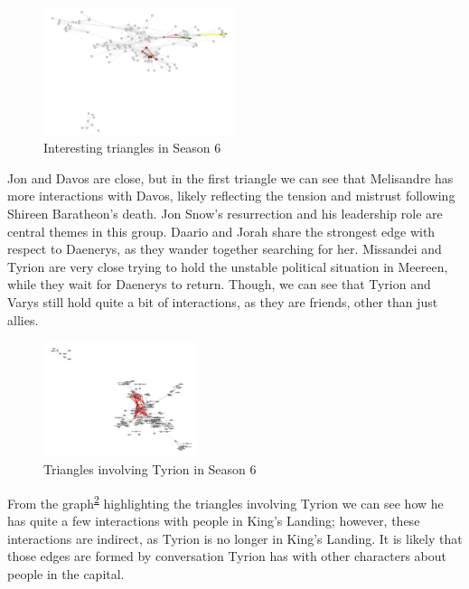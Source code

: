 \documentclass[10pt,twocolumn,letterpaper]{article}
\begin{document}
\begin{figure}[!h]
    \centering
    \includegraphics[width=0.5\textwidth]{img/s6/s6_triangles.jpg}
    \caption{\small{Interesting triangles in Season 6}}
    \label{fig:triangles_s6}
\end{figure}



Jon and Davos are close, but in the first triangle we can see that Melisandre has more interactions with Davos, likely reflecting the tension and mistrust following Shireen Baratheon’s death. Jon Snow’s resurrection and his leadership role are central themes in this group.
Daario and Jorah share the strongest edge with respect to Daenerys, as they wander together searching for her.
Missandei and Tyrion are very close trying to hold the unstable political situation in Meereen, while they wait for Daenerys to return. Though, we can see that Tyrion and Varys still hold quite a bit of interactions, as they are friends, other than just allies.

\begin{figure}[!h]
    \centering
    \includegraphics[width=0.4\textwidth]{img/s6/tyrion_triangles.jpg}
    \caption{\small{Triangles involving Tyrion in Season 6}}
    \label{fig:tyrion_triangles_s6}
\end{figure}

From the graph\textsuperscript{\ref{fig:tyrion_triangles_s6}} highlighting the triangles involving Tyrion we can see how he has quite a few interactions with people in King's Landing; however, these interactions are indirect, as Tyrion is no longer in King's Landing. It is likely that those edges are formed by conversation Tyrion has with other characters about people in the capital.
\end{document}
